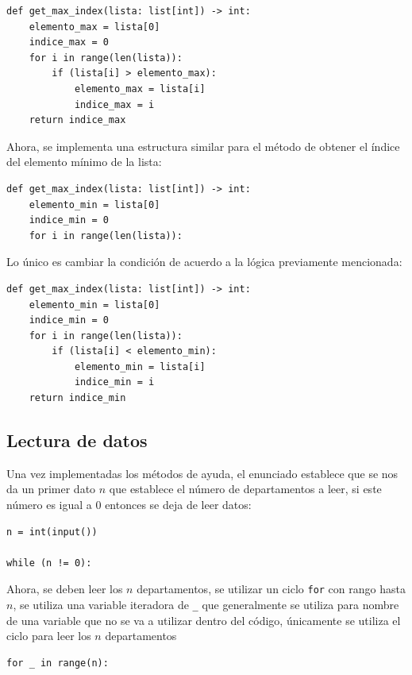 \documentclass{article}
\begin{document}
\begin{lstlisting}[style=pythonstyle]
def get_max_index(lista: list[int]) -> int:
    elemento_max = lista[0]
    indice_max = 0
    for i in range(len(lista)):
        if (lista[i] > elemento_max):
            elemento_max = lista[i]
            indice_max = i
    return indice_max
\end{lstlisting}

Ahora, se implementa una estructura similar para el método de obtener el índice del elemento mínimo de la lista:

\begin{lstlisting}[style=pythonstyle]
def get_max_index(lista: list[int]) -> int:
    elemento_min = lista[0]
    indice_min = 0
    for i in range(len(lista)):
\end{lstlisting}

Lo único es cambiar la condición de acuerdo a la lógica previamente mencionada:

\begin{lstlisting}[style=pythonstyle]
def get_max_index(lista: list[int]) -> int:
    elemento_min = lista[0]
    indice_min = 0
    for i in range(len(lista)):
        if (lista[i] < elemento_min):
            elemento_min = lista[i]
            indice_min = i
    return indice_min
\end{lstlisting}


\subsection{Lectura de datos}

Una vez implementadas los métodos de ayuda, el enunciado establece que se nos da un primer dato \(n\) que establece el número de departamentos a leer, si este número es igual a 0 entonces se deja de leer datos: 

\begin{lstlisting}[style=pythonstyle]
n = int(input())

while (n != 0):
\end{lstlisting}

Ahora, se deben leer los \(n\) departamentos, se utilizar un ciclo \lstinline[style=pythonstyle]|for| con rango hasta \(n\), se utiliza una variable iteradora de \texttt{\_} que generalmente se utiliza para nombre de una variable que no se va a utilizar dentro del código, únicamente se utiliza el ciclo para leer los \(n\) departamentos

\begin{lstlisting}[style=pythonstyle]
for _ in range(n):
\end{lstlisting}
\end{document}

